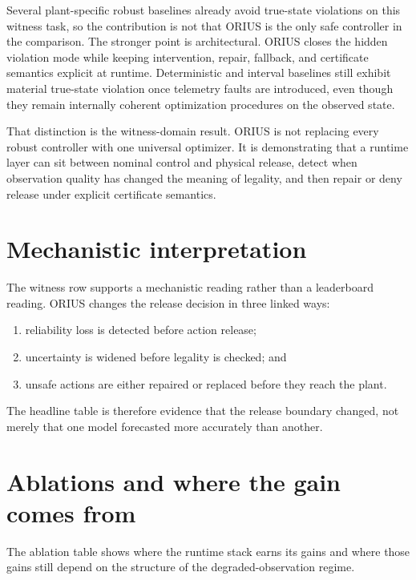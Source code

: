 
Several plant-specific robust baselines already avoid true-state violations on this witness
task, so the contribution is not that ORIUS is the only safe controller in the comparison.
The stronger point is architectural. ORIUS closes the hidden violation mode while keeping
intervention, repair, fallback, and certificate semantics explicit at runtime. Deterministic
and interval baselines still exhibit material true-state violation once telemetry faults are
introduced, even though they remain internally coherent optimization procedures on the
observed state.

That distinction is the witness-domain result. ORIUS is not replacing every robust
controller with one universal optimizer. It is demonstrating that a runtime layer can sit
between nominal control and physical release, detect when observation quality has changed the
meaning of legality, and then repair or deny release under explicit certificate semantics.

\section{Mechanistic interpretation}
The witness row supports a mechanistic reading rather than a leaderboard reading. ORIUS
changes the release decision in three linked ways:
\begin{enumerate}
  \item reliability loss is detected before action release;
  \item uncertainty is widened before legality is checked; and
  \item unsafe actions are either repaired or replaced before they reach the plant.
\end{enumerate}
The headline table is therefore evidence that the release boundary changed, not merely that
one model forecasted more accurately than another.

\section{Ablations and where the gain comes from}
The ablation table shows where the runtime stack earns its gains and where those gains still
depend on the structure of the degraded-observation regime.


